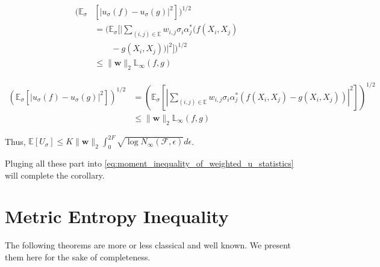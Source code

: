 \documentclass[letterpaper]{article} %
\def\DoubleColumn{}
\def\DoubleColumnEnd{}
\def\SingleColumn{}
\def\SingleColumnEnd{}
\newcommand{\E}{\mathbb{E}}
\newcommand{\weight}{\mathbf{w}}
\newcommand{\rademacher}{\sigma}
\newcommand{\pair}[1]{(#1)}
\newcommand{\lebesgue}{\mathbb{L}}
\begin{document}
\DoubleColumn
\begin{align*}
    (\E_\rademacher&[|u_\rademacher(f)-u_\rademacher(g)|^2])^{1/2}\\
    &=(\E_\rademacher[|\sum_{\pair{i,j}\in\E}w_{i,j}\rademacher_i\alpha_j^*(f(X_i,X_j)\\
    &\qquad-g(X_i,X_j))|^2])^{1/2}\\
    &\le \|\weight{}\|_2\lebesgue_\infty(f,g)
\end{align*}
\DoubleColumnEnd 
\SingleColumn
\begin{align*}
    (\E_\rademacher[|u_\rademacher(f)-u_\rademacher(g)|^2])^{1/2}&=(\E_\rademacher[|\sum_{\pair{i,j}\in\E}w_{i,j}\rademacher_i\alpha_j^*(f(X_i,X_j)-g(X_i,X_j))|^2])^{1/2}\\
    &\le \|\weight{}\|_2\lebesgue_\infty(f,g)
\end{align*}
\SingleColumnEnd
Thus, $\E[U_\rademacher]\le K\|\weight{}\|_2\int_0^{2F}\sqrt{\log N_\infty(\mathcal F,\epsilon)}d\epsilon$.

Pluging all these part into \eqref{eq:moment_inequality_of_weighted_u_statistics} will complete the corollary.
\section{Metric Entropy Inequality} %
\label{sub:metric_entropy_inequality}

The following theorems are more or less classical and well known. We present them here for the sake of completeness.
\end{document}
